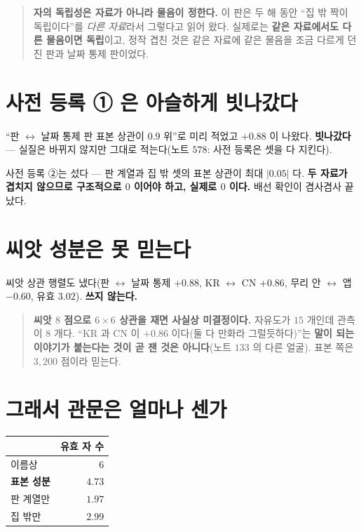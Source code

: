 \documentclass[11pt]{article}
\begin{document}
\begin{quote}
\textbf{자의 독립성은 자료가 아니라 물음이 정한다.} 이 판은 두 해 동안
``집 밖 짝이 독립이다''를 \emph{다른 자료}라서 그렇다고 읽어 왔다. 실제로는
\textbf{같은 자료에서도 다른 물음이면 독립}이고, 정작 겹친 것은 같은
자료에 같은 물음을 조금 다르게 던진 판과 날짜 통제 판이었다.
\end{quote}

\section{사전 등록 ① 은 아슬하게 빗나갔다}

``판 $\leftrightarrow$ 날짜 통제 판 표본 상관이 $0.9$ 위''로 미리 적었고
\textbf{$+0.88$} 이 나왔다. \textbf{빗나갔다} --- 실질은 바뀌지 않지만
그대로 적는다(노트 $578$: 사전 등록은 셋을 다 지킨다).

사전 등록 ②는 섰다 --- 판 계열과 집 밖 셋의 표본 상관이 최대 $|0.05|$ 다.
\textbf{두 자료가 겹치지 않으므로 구조적으로 $0$ 이어야 하고, 실제로 $0$
이다.} 배선 확인이 겸사겸사 끝났다.

\section{씨앗 성분은 못 믿는다}

씨앗 상관 행렬도 냈다(판 $\leftrightarrow$ 날짜 통제 $+0.88$, KR
$\leftrightarrow$ CN $+0.86$, 무리 안 $\leftrightarrow$ 앱 $-0.60$, 유효
$3.02$). \textbf{쓰지 않는다.}

\begin{quote}
\textbf{씨앗 $8$ 점으로 $6\times6$ 상관을 재면 사실상 미결정이다.} 자유도가
$15$ 개인데 관측이 $8$ 개다. ``KR 과 CN 이 $+0.86$ 이다(둘 다 만화라
그럴듯하다)''는 \textbf{말이 되는 이야기가 붙는다는 것이 곧 잰 것은
아니다}(노트 $133$ 의 다른 얼굴). 표본 쪽은 $3{,}200$ 점이라 믿는다.
\end{quote}

\section{그래서 관문은 얼마나 센가}

\begin{center}
\begin{tabular}{lr}
\hline
 & 유효 자 수 \\
\hline
이름상 & $6$ \\
\textbf{표본 성분} & $\mathbf{4.73}$ \\
판 계열만 & $1.97$ \\
집 밖만 & $2.99$ \\
\hline
\end{tabular}
\end{center}
\end{document}
